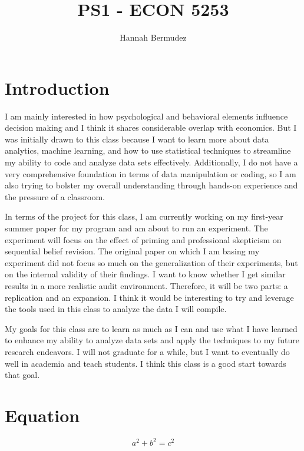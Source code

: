 \documentclass{article}
\title{PS1 - ECON 5253}
\author{Hannah Bermudez}
\begin{document}
\maketitle

\section{Introduction}

\hspace*{2em} I am mainly interested in how psychological and behavioral elements influence decision making and I think it shares considerable overlap with economics. But I was initially drawn to this class because I want to learn more about data analytics, machine learning, and how to use statistical techniques to streamline my ability to code and analyze data sets effectively. Additionally, I do not have a very comprehensive foundation in terms of data manipulation or coding, so I am also trying to bolster my overall understanding through hands-on experience and the pressure of a classroom. 

In terms of the project for this class, I am currently working on my first-year summer paper for my program and am about to run an experiment. The experiment will focus on the effect of priming and professional skepticism on sequential belief revision. The original paper on which I am basing my experiment did not focus so much on the generalization of their experiments, but on the internal validity of their findings. I want to know whether I get similar results in a more realistic audit environment. Therefore, it will be two parts: a replication and an expansion. I think it would be interesting to try and leverage the tools used in this class to analyze the data I will compile. 

My goals for this class are to learn as much as I can and use what I have learned to enhance my ability to analyze data sets and apply the techniques to my future research endeavors. I will not graduate for a while, but I want to eventually do well in academia and teach students. I think this class is a good start towards that goal.

\section{Equation}

\[ a^2 + b^2 = c^2 \]
\end{document}
